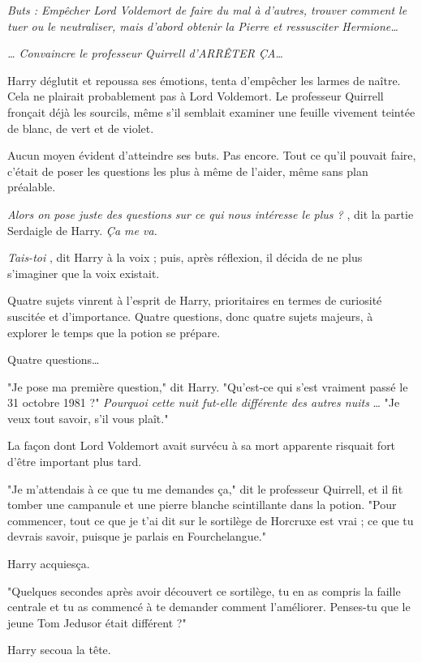 \emph{Buts : Empêcher Lord Voldemort de faire du mal à d'autres, trouver comment le tuer ou le neutraliser, mais d'abord obtenir la Pierre et ressusciter Hermione…} 

\emph{… Convaincre le professeur Quirrell d'ARRÊTER ÇA…} 

Harry déglutit et repoussa ses émotions, tenta d'empêcher les larmes de naître. Cela ne plairait probablement pas à Lord Voldemort. Le professeur Quirrell fronçait déjà les sourcils, même s'il semblait examiner une feuille vivement teintée de blanc, de vert et de violet.

Aucun moyen évident d'atteindre ses buts. Pas encore. Tout ce qu'il pouvait faire, c'était de poser les questions les plus à même de l'aider, même sans plan préalable.

\emph{Alors on pose juste des questions sur ce qui nous intéresse le plus ?} , dit la partie Serdaigle de Harry. \emph{Ça me va.} 

\emph{Tais-toi} , dit Harry à la voix ; puis, après réflexion, il décida de ne plus s'imaginer que la voix existait.

Quatre sujets vinrent à l'esprit de Harry, prioritaires en termes de curiosité suscitée et d'importance. Quatre questions, donc quatre sujets majeurs, à explorer le temps que la potion se prépare.

Quatre questions…

"Je pose ma première question," dit Harry. "Qu'est-ce qui s'est vraiment passé le 31 octobre 1981 ?" \emph{Pourquoi cette nuit fut-elle différente des autres nuits} … "Je veux tout savoir, s'il vous plaît."

La façon dont Lord Voldemort avait survécu à sa mort apparente risquait fort d'être important plus tard.

"Je m'attendais à ce que tu me demandes ça," dit le professeur Quirrell, et il fit tomber une campanule et une pierre blanche scintillante dans la potion. "Pour commencer, tout ce que je t'ai dit sur le sortilège de Horcruxe est vrai ; ce que tu devrais savoir, puisque je parlais en Fourchelangue."

Harry acquiesça.

"Quelques secondes après avoir découvert ce sortilège, tu en as compris la faille centrale et tu as commencé à te demander comment l'améliorer. Penses-tu que le jeune Tom Jedusor était différent ?"

Harry secoua la tête.

